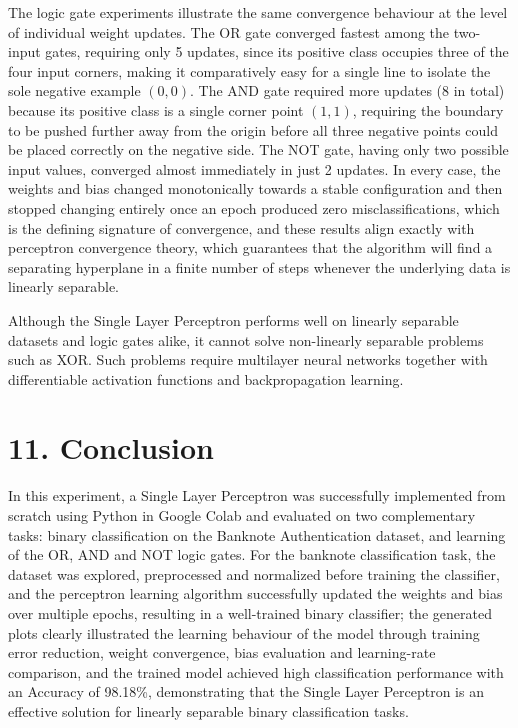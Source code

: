 \documentclass[11pt,a4paper]{article}
\begin{document}
The logic gate experiments illustrate the same convergence behaviour at the level of individual weight updates. The OR gate converged fastest among the two-input gates, requiring only 5 updates, since its positive class occupies three of the four input corners, making it comparatively easy for a single line to isolate the sole negative example $(0,0)$. The AND gate required more updates (8 in total) because its positive class is a single corner point $(1,1)$, requiring the boundary to be pushed further away from the origin before all three negative points could be placed correctly on the negative side. The NOT gate, having only two possible input values, converged almost immediately in just 2 updates. In every case, the weights and bias changed monotonically towards a stable configuration and then stopped changing entirely once an epoch produced zero misclassifications, which is the defining signature of convergence, and these results align exactly with perceptron convergence theory, which guarantees that the algorithm will find a separating hyperplane in a finite number of steps whenever the underlying data is linearly separable.

Although the Single Layer Perceptron performs well on linearly separable datasets and logic gates alike, it cannot solve non-linearly separable problems such as XOR. Such problems require multilayer neural networks together with differentiable activation functions and backpropagation learning.
\newpage
\section*{11. Conclusion}

In this experiment, a Single Layer Perceptron was successfully implemented from scratch using Python in Google Colab and evaluated on two complementary tasks: binary classification on the Banknote Authentication dataset, and learning of the OR, AND and NOT logic gates. For the banknote classification task, the dataset was explored, preprocessed and normalized before training the classifier, and the perceptron learning algorithm successfully updated the weights and bias over multiple epochs, resulting in a well-trained binary classifier; the generated plots clearly illustrated the learning behaviour of the model through training error reduction, weight convergence, bias evaluation and learning-rate comparison, and the trained model achieved high classification performance with an Accuracy of 98.18\%, demonstrating that the Single Layer Perceptron is an effective solution for linearly separable binary classification tasks.
\end{document}
